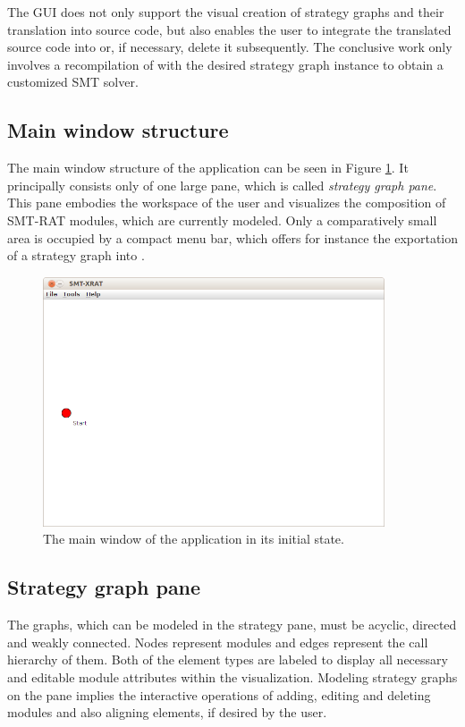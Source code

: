 The GUI does not only support the visual creation of strategy 
graphs and their translation into source code, but also enables 
the user to integrate the translated source code into \smtrat or, 
if necessary, delete it subsequently. The conclusive work only 
involves a recompilation of \smtrat with the desired strategy 
graph instance to obtain a customized SMT solver.

\subsection{Main window structure}
\label{sec:main_window_structure_of_smt-xrat}
The main window structure of the \smtxrat application can be seen 
in Figure \ref{fig:smt-xrat_main_window}. It principally consists 
only of one large pane, which is called \emph{strategy graph pane}. 
This pane embodies the workspace of the user and visualizes the 
composition of SMT-RAT modules, which are currently modeled. Only a
comparatively small area is occupied by a compact menu bar, which 
offers for instance the exportation of a strategy graph into \smtrat.
\begin{figure}[ht]
  \begin{center}
    \includegraphics[width=0.9\textwidth]{graphics/smt-xrat_main_window.png}
  \end{center}
  \caption{The main window of the \smtxrat application in its initial state.}
  \label{fig:smt-xrat_main_window}
\end{figure}

\subsection{Strategy graph pane}
\label{sec:the_strategy_graph_pane}
The graphs, which can be modeled in the strategy pane, must be acyclic, directed and weakly 
connected. Nodes represent \smtrat modules and edges represent the call 
hierarchy of them. Both of the element types are labeled to display all 
necessary and editable module attributes within the visualization.
Modeling strategy graphs on the pane implies the interactive operations 
of adding, editing and deleting modules and also aligning elements, 
if desired by the user.

